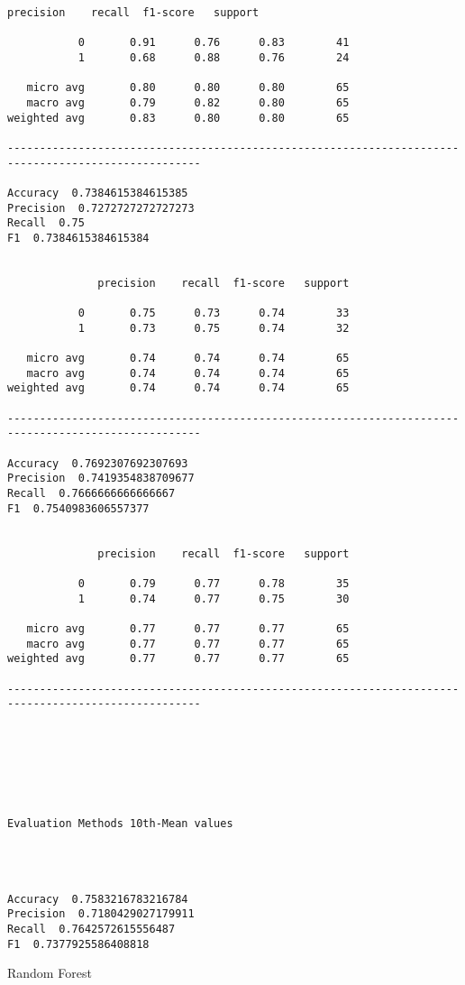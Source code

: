 \documentclass[11pt]{article}
\begin{document}
\begin{Verbatim}[commandchars=\\\{\}]
              precision    recall  f1-score   support

           0       0.91      0.76      0.83        41
           1       0.68      0.88      0.76        24

   micro avg       0.80      0.80      0.80        65
   macro avg       0.79      0.82      0.80        65
weighted avg       0.83      0.80      0.80        65

---------------------------------------------------------------------------------------------------- 

Accuracy  0.7384615384615385
Precision  0.7272727272727273
Recall  0.75
F1  0.7384615384615384


              precision    recall  f1-score   support

           0       0.75      0.73      0.74        33
           1       0.73      0.75      0.74        32

   micro avg       0.74      0.74      0.74        65
   macro avg       0.74      0.74      0.74        65
weighted avg       0.74      0.74      0.74        65

---------------------------------------------------------------------------------------------------- 

Accuracy  0.7692307692307693
Precision  0.7419354838709677
Recall  0.7666666666666667
F1  0.7540983606557377


              precision    recall  f1-score   support

           0       0.79      0.77      0.78        35
           1       0.74      0.77      0.75        30

   micro avg       0.77      0.77      0.77        65
   macro avg       0.77      0.77      0.77        65
weighted avg       0.77      0.77      0.77        65

---------------------------------------------------------------------------------------------------- 







Evaluation Methods 10th-Mean values




Accuracy  0.7583216783216784
Precision  0.7180429027179911
Recall  0.7642572615556487
F1  0.7377925586408818

    \end{Verbatim}

    Random Forest
\end{document}
